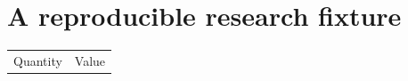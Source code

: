 \documentclass{article}
\begin{document}
\section{A reproducible research fixture}

\begin{tabular}{lr}
Quantity & Value \\

\end{tabular}
\end{document}
